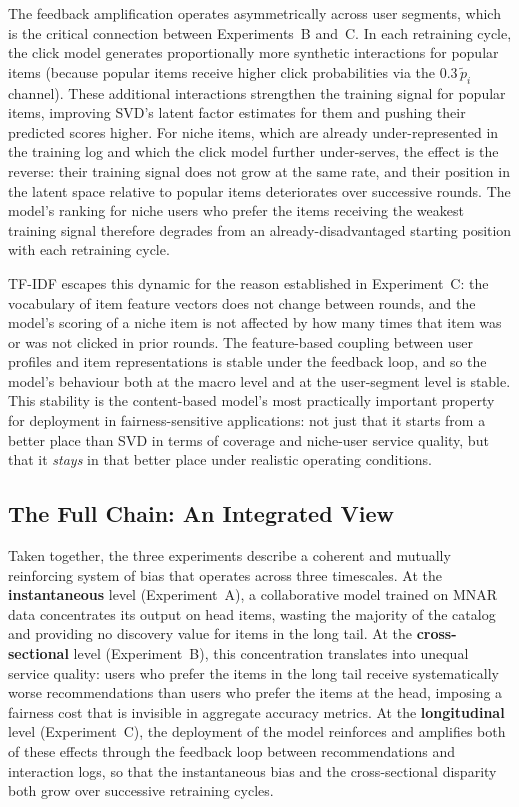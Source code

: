 \documentclass[11pt,a4paper]{report}
\begin{document}
The feedback amplification operates asymmetrically across user segments, which is the critical connection between Experiments~B and~C. In each retraining cycle, the click model generates proportionally more synthetic interactions for popular items (because popular items receive higher click probabilities via the $0.3\, \tilde{p}_i$ channel). These additional interactions strengthen the training signal for popular items, improving SVD's latent factor estimates for them and pushing their predicted scores higher. For niche items, which are already under-represented in the training log and which the click model further under-serves, the effect is the reverse: their training signal does not grow at the same rate, and their position in the latent space relative to popular items deteriorates over successive rounds. The model's ranking for niche users who prefer the items receiving the weakest training signal therefore degrades from an already-disadvantaged starting position with each retraining cycle.

TF-IDF escapes this dynamic for the reason established in Experiment~C: the vocabulary of item feature vectors does not change between rounds, and the model's scoring of a niche item is not affected by how many times that item was or was not clicked in prior rounds. The feature-based coupling between user profiles and item representations is stable under the feedback loop, and so the model's behaviour both at the macro level and at the user-segment level is stable. This stability is the content-based model's most practically important property for deployment in fairness-sensitive applications: not just that it starts from a better place than SVD in terms of coverage and niche-user service quality, but that it \emph{stays} in that better place under realistic operating conditions.

\subsection*{The Full Chain: An Integrated View}

Taken together, the three experiments describe a coherent and mutually reinforcing system of bias that operates across three timescales. At the \textbf{instantaneous} level (Experiment~A), a collaborative model trained on MNAR data concentrates its output on head items, wasting the majority of the catalog and providing no discovery value for items in the long tail. At the \textbf{cross-sectional} level (Experiment~B), this concentration translates into unequal service quality: users who prefer the items in the long tail receive systematically worse recommendations than users who prefer the items at the head, imposing a fairness cost that is invisible in aggregate accuracy metrics. At the \textbf{longitudinal} level (Experiment~C), the deployment of the model reinforces and amplifies both of these effects through the feedback loop between recommendations and interaction logs, so that the instantaneous bias and the cross-sectional disparity both grow over successive retraining cycles.
\end{document}
